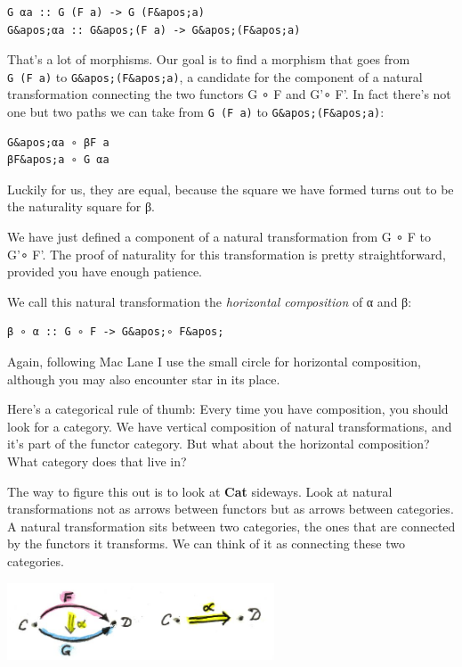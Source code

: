 \begin{verbatim}
G αa :: G (F a) -> G (F&apos;a)
G&apos;αa :: G&apos;(F a) -> G&apos;(F&apos;a)
\end{verbatim}

That's a lot of morphisms. Our goal is to find a morphism that goes from
\texttt{G\ (F\ a)} to \texttt{G\&apos;(F\&apos;a)}, a candidate for the
component of a natural transformation connecting the two functors G ∘ F
and G'∘ F'. In fact there's not one but two paths we can take from
\texttt{G\ (F\ a)} to \texttt{G\&apos;(F\&apos;a)}:

\begin{verbatim}
G&apos;αa ∘ βF a
βF&apos;a ∘ G αa
\end{verbatim}

Luckily for us, they are equal, because the square we have formed turns
out to be the naturality square for β.

We have just defined a component of a natural transformation from G ∘ F
to G'∘ F'. The proof of naturality for this transformation is pretty
straightforward, provided you have enough patience.

We call this natural transformation the \emph{horizontal composition} of
α and β:

\begin{verbatim}
β ∘ α :: G ∘ F -> G&apos;∘ F&apos;
\end{verbatim}

Again, following Mac Lane I use the small circle for horizontal
composition, although you may also encounter star in its place.

Here's a categorical rule of thumb: Every time you have composition, you
should look for a category. We have vertical composition of natural
transformations, and it's part of the functor category. But what about
the horizontal composition? What category does that live in?

The way to figure this out is to look at \textbf{Cat} sideways. Look at
natural transformations not as arrows between functors but as arrows
between categories. A natural transformation sits between two
categories, the ones that are connected by the functors it transforms.
We can think of it as connecting these two categories.

\includegraphics[width=3.12500in]{images/sideways.jpg}

